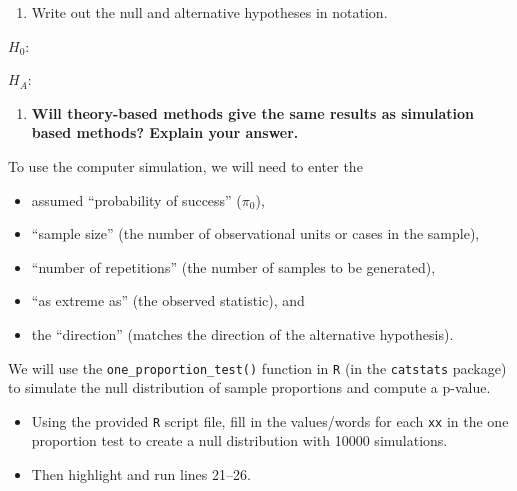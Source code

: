 \documentclass[
]{report}
\providecommand{\tightlist}{%
  \setlength{\itemsep}{0pt}\setlength{\parskip}{0pt}}
\begin{document}
\vspace{0.5in}

\begin{enumerate}
\def\labelenumi{\arabic{enumi}.}
\setcounter{enumi}{3}
\tightlist
\item
  Write out the null and alternative hypotheses in notation.
\end{enumerate}

\vspace{1mm}

\(H_0:\)

\vspace{0.3in}

\(H_A:\)

\vspace{0.3in}

\begin{enumerate}
\def\labelenumi{\arabic{enumi}.}
\setcounter{enumi}{4}
\tightlist
\item
  \textbf{Will theory-based methods give the same results as simulation based methods? Explain your answer.}
\end{enumerate}

\vspace{1in}

To use the computer simulation, we will need to enter the

\begin{itemize}
\item
  assumed ``probability of success'' (\(\pi_0\)),
\item
  ``sample size'' (the number of observational units or cases in the sample),
\item
  ``number of repetitions'' (the number of samples to be generated),
\item
  ``as extreme as'' (the observed statistic), and
\item
  the ``direction'' (matches the direction of the alternative hypothesis).
\end{itemize}

We will use the \texttt{one\_proportion\_test()} function in \texttt{R} (in the \texttt{catstats} package) to simulate the null distribution of sample proportions and compute a p-value.

\begin{itemize}
\item
  Using the provided \texttt{R} script file, fill in the values/words for each \texttt{xx} in the one proportion test to create a null distribution with 10000 simulations.
\item
  Then highlight and run lines 21--26.
\end{itemize}
\end{document}
